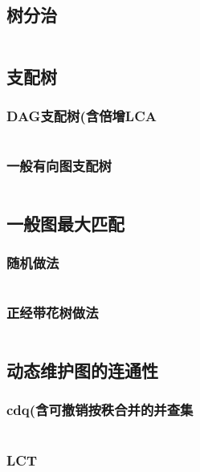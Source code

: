 \documentclass{article}
\begin{document}
\subsection{树分治} %
\inputminted[breaklines]{c++}{../图论/树分治.cpp} %

\subsection{支配树}
\subsubsection{DAG支配树(含倍增LCA}
\inputminted[breaklines]{c++}{../图论/DAG支配树.cpp}

\subsubsection{一般有向图支配树}
\inputminted[breaklines]{c++}{../图论/一般有向图支配树.cpp}

\subsection{一般图最大匹配}
\subsubsection{随机做法}
\inputminted[breaklines]{c++}{../图论/一般图最大匹配随机.cpp}

\subsubsection{正经带花树做法}
\inputminted[breaklines]{c++}{../图论/一般图最大匹配带花树.cpp}

\subsection{动态维护图的连通性}
\subsubsection{cdq(含可撤销按秩合并的并查集}
\inputminted[breaklines]{c++}{../图论/cdq维护连通性.cpp}

\subsubsection{LCT}
\inputminted[breaklines]{c++}{../图论/LCT维护连通性.cpp}
\end{document}
